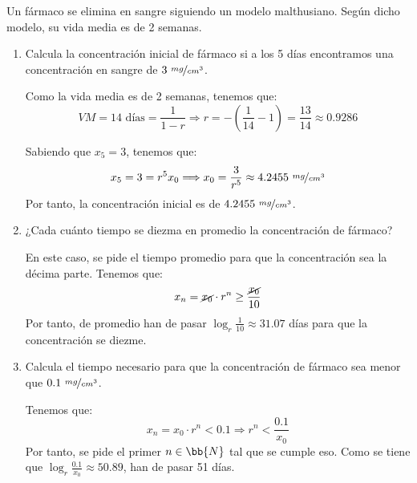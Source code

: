 \begin{ejercicio} 
Un fármaco se elimina en sangre siguiendo un modelo malthusiano.
Según dicho modelo, su vida media es de 2 semanas.
    \begin{enumerate}
        \item Calcula la concentración inicial de fármaco si a los 5 días encontramos una concentración en sangre de \(3~\nicefrac{mg}{cm^3}\).

        Como la vida media es de 2 semanas, tenemos que:
        \begin{equation*}
            VM = 14 \text{ días} = \frac{1}{1-r} \Longrightarrow r = -\left(\frac{1}{14}-1\right) = \frac{13}{14} \approx 0.9286 
        \end{equation*}

        Sabiendo que $x_5=3$, tenemos que:
        \begin{equation*}
            x_5 = 3 = r^5 x_0 \Longrightarrow x_0 = \frac{3}{r^5} \approx 4.2455~\nicefrac{mg}{cm^3}
        \end{equation*}
        Por tanto, la concentración inicial es de $4.2455~\nicefrac{mg}{cm^3}$.
        
        \item ¿Cada cuánto tiempo se diezma en promedio la concentración de fármaco?

        En este caso, se pide el tiempo promedio para que la concentración sea la décima parte. Tenemos que:
        \begin{equation*}
            x_n = \cancel{x_0}\cdot r^n \geq \frac{\cancel{x_0}}{10} 
        \end{equation*}
        Por tanto, de promedio han de pasar $\log_{r}\frac{1}{10}\approx 31.07$ días para que la concentración se diezme. 
        
        \item Calcula el tiempo necesario para que la concentración de fármaco sea menor que \(0.1~\nicefrac{mg}{cm^3}\).

        Tenemos que:
        \begin{equation*}
            x_n = x_0\cdot r^n < 0.1 
            \Longrightarrow r^n < \frac{0.1}{x_0}
        \end{equation*}
        Por tanto, se pide el primer $n\in \bb{N}$ tal que se cumple eso. Como se tiene que $\log_{r}\frac{0.1}{x_0}\approx 50.89$, han de pasar 51 días.
    \end{enumerate}
\end{ejercicio}

